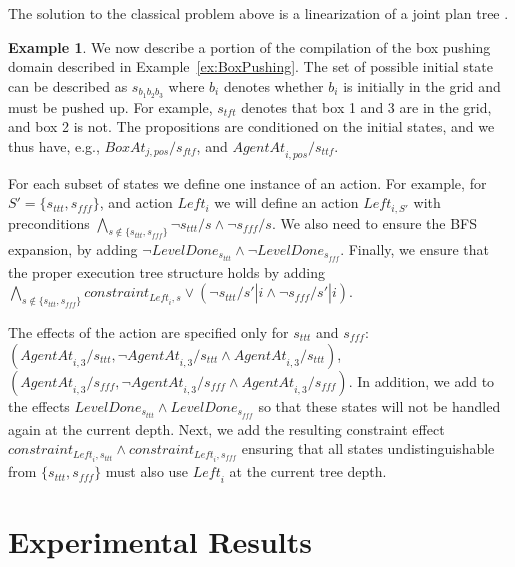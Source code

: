 \documentclass[letterpaper]{article}
\theoremstyle{definition}
\newtheorem{example}{Example}
\begin{document}
The solution to the classical problem above is a linearization of a joint plan tree \cite{MPSR}.


\begin{example}
We now describe a portion of the compilation of the box pushing domain described in Example~\ref{ex:BoxPushing}. The set of possible initial state can be described as $s_{b_1b_2 b_3}$ where $b_i$ denotes whether $b_i$ is initially in the grid and must be pushed up. For example, $s_{tft}$ denotes that box 1 and 3 are in the grid, and box 2 is not. The propositions are conditioned on the initial states, and we thus have, e.g., $\mathit{BoxAt}_{j,pos}/s_\mathit{ftf}$, and $\mathit{AgentAt}_{i,pos}/s_\mathit{ttf}$.

For each subset of states we define one instance of an action. For example, for $S'=\{s_\mathit{ttt},s_\mathit{fff}\}$, and action $\mathit{Left_i}$ we will define an action $\mathit{Left_{i,S'}}$ with preconditions $ \bigwedge_{s \notin \{s_\mathit{ttt},s_\mathit{fff}\}} \neg s_\mathit{ttt}/s \wedge \neg s_\mathit{fff}/s$. We also need to ensure the BFS expansion, by adding $\neg \mathit{LevelDone}_{s_\mathit{ttt}} \wedge \neg \mathit{LevelDone}_{s_\mathit{fff}}$. Finally, we ensure that the proper execution tree structure holds by adding $\bigwedge_{s \notin\{s_\mathit{ttt},s_\mathit{fff}\}} constraint_{\mathit{Left}_i,s} \vee ( \neg s_\mathit{ttt}/s'|i \wedge \neg s_\mathit{fff}/s'|i)$.

\noindent The effects of the action are specified only for $s_\mathit{ttt}$ and $s_\mathit{fff}$: \\
$(\mathit{AgentAt}_{i,3}/s_\mathit{ttt}, \neg \mathit{AgentAt}_{i,3}/s_\mathit{ttt} \wedge \mathit{AgentAt}_{i,3}/s_\mathit{ttt})$,
$(\mathit{AgentAt}_{i,3}/s_\mathit{fff}, \neg \mathit{AgentAt}_{i,3}/s_\mathit{fff} \wedge \mathit{AgentAt}_{i,3}/s_\mathit{fff})$.
In addition, we add to the effects $\mathit{LevelDone}_{s_\mathit{ttt}} \wedge \mathit{LevelDone}_{s_\mathit{fff}}$ so that these states will not be handled again at the current depth. Next, we add the resulting constraint effect $constraint_{\mathit{Left}_i,s_\mathit{ttt}} \wedge constraint_{\mathit{Left}_i,s_\mathit{fff}}$ ensuring that all states undistinguishable from $\{s_\mathit{ttt},s_\mathit{fff}\}$ must also use $\mathit{Left}_i$ at the current tree depth.

\end{example}



\section{Experimental Results}
\end{document}
